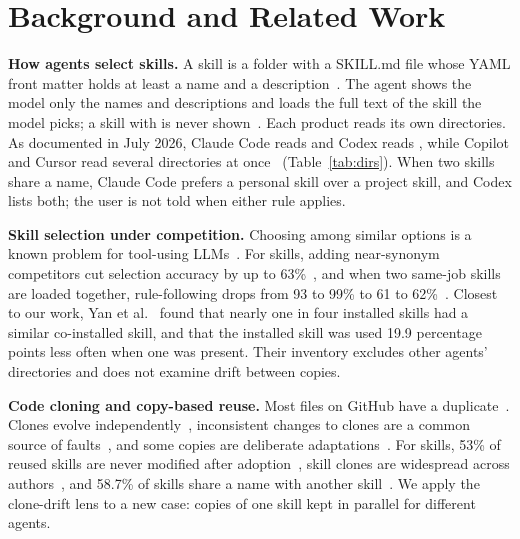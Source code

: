\section{Background and Related Work}
\label{sec:background}

\textbf{How agents select skills.} A skill is a folder with a SKILL.md file whose YAML front matter holds at least a name and a description~\cite{agentskillsspec}. The agent shows the model only the names and descriptions and loads the full text of the skill the model picks; a skill with  is never shown~\cite{claudecodeskills}. Each product reads its own directories. As documented in July 2026, Claude Code reads  and Codex reads , while Copilot and Cursor read several directories at once~\cite{claudecodeskills,codexskills,vscodeskills,cursorskills} (Table~\ref{tab:dirs}). When two skills share a name, Claude Code prefers a personal skill over a project skill, and Codex lists both; the user is not told when either rule applies.

\textbf{Skill selection under competition.} Choosing among similar options is a known problem for tool-using LLMs~\cite{huang2024metatool,qin2024toolllm}. For skills, adding near-synonym competitors cut selection accuracy by up to 63\%~\cite{li2026singleagent}, and when two same-job skills are loaded together, rule-following drops from 93 to 99\% to 61 to 62\%~\cite{razmara2026takeover}. Closest to our work, Yan et al.~\cite{yan2026oneskill} found that nearly one in four installed skills had a similar co-installed skill, and that the installed skill was used 19.9 percentage points less often when one was present. Their inventory excludes other agents' directories and does not examine drift between copies.

\textbf{Code cloning and copy-based reuse.} Most files on GitHub have a duplicate~\cite{lopes2017dejavu}. Clones evolve independently~\cite{kim2005genealogies}, inconsistent changes to clones are a common source of faults~\cite{juergens2009clones}, and some copies are deliberate adaptations~\cite{kapser2008cloning}. For skills, 53\% of reused skills are never modified after adoption~\cite{gao2026registry}, skill clones are widespread across authors~\cite{zhu2026latent}, and 58.7\% of skills share a name with another skill~\cite{jia2026islands}. We apply the clone-drift lens to a new case: copies of one skill kept in parallel for different agents.
